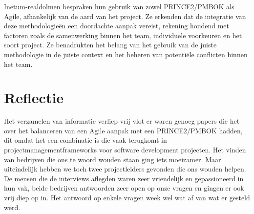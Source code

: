 \documentclass[dutch]{hogent-article}
\begin{document}
Inetum-realdolmen bespraken hun gebruik van zowel PRINCE2/PMBOK als Agile, afhankelijk van de aard van het project. Ze erkenden dat de integratie van deze methodologieën een doordachte aanpak vereist, rekening houdend met factoren zoals de samenwerking binnen het team, individuele voorkeuren en het soort project. Ze benadrukten het belang van het gebruik van de juiste methodologie in de juiste context en het beheren van potentiële conflicten binnen het team.
\newline



\section{Reflectie}
\label{sec:reflectie}
Het verzamelen van informatie verliep vrij vlot er waren genoeg papers die het over het balanceren van
een Agile aanpak met een PRINCE2/PMBOK hadden, dit omdat het een combinatie is die vaak terugkomt in
projectmanagementframeworks voor software development projecten. Het vinden van bedrijven die ons te woord wouden staan ging iets moeizamer.
Maar uiteindelijk hebben we toch twee projectleiders gevonden die ons wouden helpen. De mensen die de
interviews aflegden waren zeer vriendelijk en gepassioneerd in hun vak, beide bedrijven antwoorden zeer open op onze vragen en gingen er ook vrij diep op in.
Het antwoord op enkele vragen week wel wat af van wat er gesteld werd.
\printbibliography[heading=bibintoc]
\end{document}
